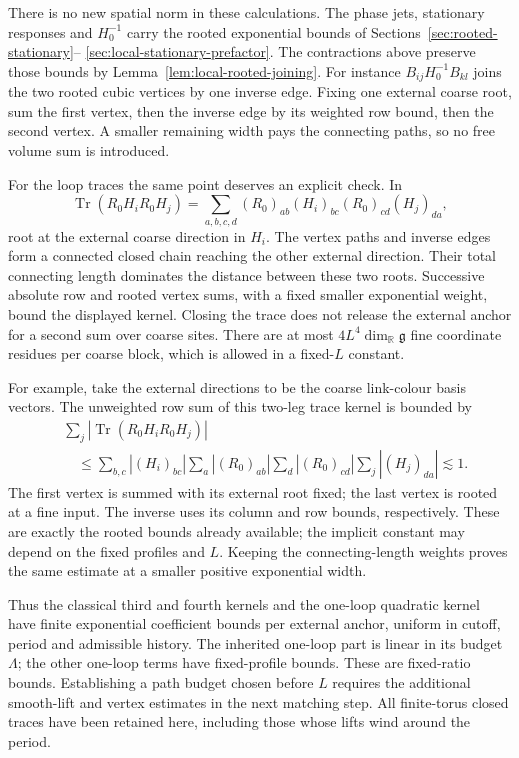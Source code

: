 \documentclass[11pt,reqno]{amsart}
\numberwithin{equation}{section}
\theoremstyle{definition}
\theoremstyle{remark}
\newcommand{\R}{\mathbb R}
\newcommand{\g}{\mathfrak g}
\begin{document}
There is no new spatial norm in these calculations.
The phase jets, stationary responses and \(H_0^{-1}\)
carry the rooted exponential bounds of
Sections~\ref{sec:rooted-stationary}--%
\ref{sec:local-stationary-prefactor}.
The contractions above preserve those bounds by
Lemma~\ref{lem:local-rooted-joining}.
For instance \(B_{ij}H_0^{-1}B_{kl}\) joins the two
rooted cubic vertices by one inverse edge. Fixing
one external coarse root, sum the first vertex,
then the inverse edge by its weighted row bound,
then the second vertex. A smaller remaining width
pays the connecting paths, so no free volume sum
is introduced.

For the loop traces the same point deserves an
explicit check. In
\[
 \operatorname{Tr}(R_0H_iR_0H_j)
       =\sum_{a,b,c,d}(R_0)_{ab}(H_i)_{bc}
                         (R_0)_{cd}(H_j)_{da},
\]
root at the external coarse direction in
\(H_i\). The vertex paths and inverse edges
form a connected closed chain reaching the other
external direction. Their total connecting length
dominates the distance between these two roots.
Successive absolute row and rooted vertex sums,
with a fixed smaller exponential weight, bound
the displayed kernel. Closing the trace does
not release the external anchor for a second
sum over coarse sites. There are at most
\(4L^4\dim_\R\g\) fine coordinate residues per
coarse block, which is allowed in a fixed-\(L\)
constant.

For example, take the external directions to be the
coarse link-colour basis vectors. The unweighted
row sum of this two-leg trace kernel is bounded by
\[
 \begin{split}
 &\sum_j\left|\operatorname{Tr}
                      (R_0H_iR_0H_j)\right|\\
 &\quad\le\sum_{b,c}|(H_i)_{bc}|
       \sum_a|(R_0)_{ab}|\sum_d|(R_0)_{cd}|
                         \sum_j|(H_j)_{da}|
 \lesssim1 .
 \end{split}
\]
The first vertex is summed with its external root fixed;
the last vertex is rooted at a fine input. The inverse
uses its column and row bounds, respectively. These are
exactly the rooted bounds already available; the implicit
constant may depend on the fixed profiles and \(L\).
Keeping the connecting-length weights proves the same
estimate at a smaller positive exponential width.

Thus the classical third and fourth kernels and
the one-loop quadratic kernel have finite
exponential coefficient bounds per external
anchor, uniform in cutoff, period and admissible
history. The inherited one-loop part is linear
in its budget \(\Lambda\); the other one-loop
terms have fixed-profile bounds. These are
fixed-ratio bounds. Establishing a path budget
chosen before \(L\) requires the additional
smooth-lift and vertex estimates in the next
matching step. All finite-torus closed traces
have been retained here, including those whose
lifts wind around the period.
\end{document}
